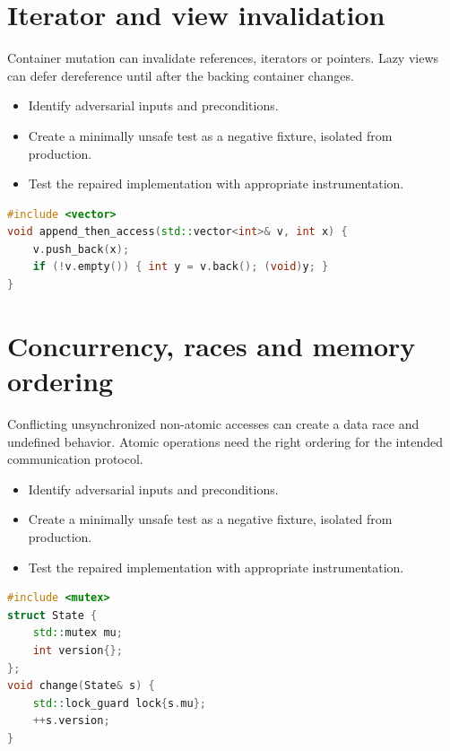 \documentclass[11pt]{article}
\begin{document}
\section{Iterator and view invalidation}
Container mutation can invalidate references, iterators or pointers. Lazy views can defer dereference until after the backing container changes.

\begin{itemize}[leftmargin=*,itemsep=1pt,topsep=3pt]
\item Identify adversarial inputs and preconditions.
\item Create a minimally unsafe test as a negative fixture, isolated from production.
\item Test the repaired implementation with appropriate instrumentation.
\end{itemize}
\begin{lstlisting}[language=C++]
#include <vector>
void append_then_access(std::vector<int>& v, int x) {
    v.push_back(x);
    if (!v.empty()) { int y = v.back(); (void)y; }
}
\end{lstlisting}
\section{Concurrency, races and memory ordering}
Conflicting unsynchronized non-atomic accesses can create a data race and undefined behavior. Atomic operations need the right ordering for the intended communication protocol.

\begin{itemize}[leftmargin=*,itemsep=1pt,topsep=3pt]
\item Identify adversarial inputs and preconditions.
\item Create a minimally unsafe test as a negative fixture, isolated from production.
\item Test the repaired implementation with appropriate instrumentation.
\end{itemize}
\begin{lstlisting}[language=C++]
#include <mutex>
struct State {
    std::mutex mu;
    int version{};
};
void change(State& s) {
    std::lock_guard lock{s.mu};
    ++s.version;
}
\end{lstlisting}
\end{document}
